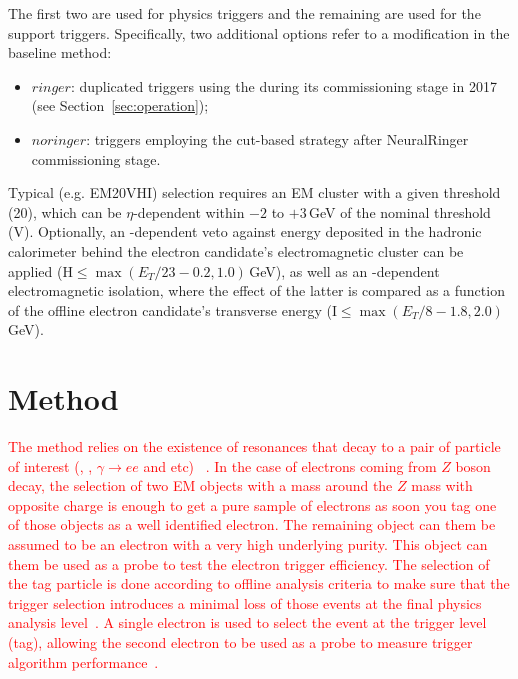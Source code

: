 The first two are used for physics triggers and the remaining are used
for the support triggers. Specifically, two additional options refer to
a modification in the \fastcalo{} baseline method:

\begin{itemize}
\item $ringer$: duplicated triggers using the \rnn during its
  commissioning stage in 2017 (see Section~\ref{sec:operation});
\item $noringer$: triggers employing the cut-based strategy after NeuralRinger
  commissioning stage.
\end{itemize}


Typical \licalo (e.g. EM20VHI) selection requires an EM cluster with a
given threshold (20), which can be  $\eta$-dependent within $-2$ to $+3\,$GeV
of the nominal threshold (V). Optionally, an \et-dependent veto against energy
deposited in the hadronic calorimeter behind the electron candidate's
electromagnetic cluster can be applied (H$\le \max(E_T/23-0.2, 1.0)\,$GeV), as
well as an \et-dependent electromagnetic isolation, where the effect of the
latter is compared as a function of the offline electron candidate's transverse
energy (I$\le \max(E_T/8-1.8, 2.0)\,$GeV).



\section{\TnP Method}\label{ssec:tnp}

\textcolor{red}{The \tnp{} method relies on the existence of resonances that decay to a pair of particle of interest (\Zee{}, \Jee{}, $\gamma \rightarrow ee$ and etc) ~\cite{PERF-2016-01}. In the case of electrons coming from $Z$ boson decay, the selection of two EM objects with a mass around the $Z$ mass with opposite charge is enough to get a pure sample of electrons as soon you tag one of those objects as a well identified electron. The remaining object can them be assumed to be an electron with a very high underlying purity. This object can them be used as a probe to test the electron trigger efficiency. The selection of the tag particle is done according to offline analysis criteria to make sure that the trigger selection introduces a minimal loss of those events at the final physics analysis level~\cite{aaboud2019electron}. A single electron is used to select the event at the trigger level (tag), allowing the second electron to be used as a probe to measure trigger algorithm performance~\cite{aad2020performance}.}

